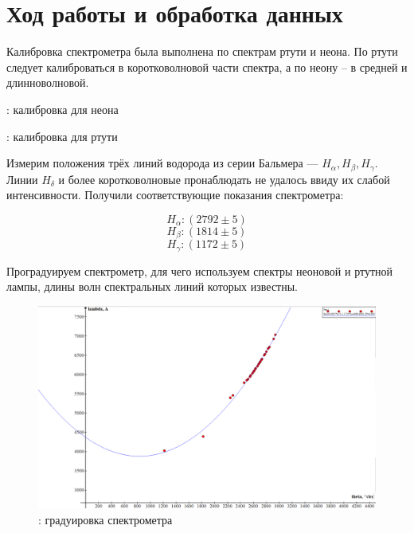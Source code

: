         \newpage

        \section{Ход работы и обработка данных}
        
        Калибровка спектрометра была выполнена по спектрам ртути и неона. По ртути следует калиброваться в коротковолновой части спектра, а по неону -- в средней и длинноволновой.

        \begin{table}[h!]
            \centering
            
            \caption{: калибровка для неона}
        \label{tb1}
        \end{table}
    
        \begin{table}[h!]
            \centering
            
            \caption{: калибровка для ртути}
        \label{tb2}
        \end{table}

        Измерим положения трёх линий водорода из серии Бальмера --- $H_{\alpha}, H_{\beta}, H_{\gamma}$. Линии $H_{\delta}$ и более коротковолновые пронаблюдать не удалось ввиду их слабой интенсивности.	Получили соответствующие показания спектрометра:
		
		\[	H_{\alpha}: (2792\pm 5) \] 
        \[  H_{\beta} : (1814 \pm 5) \]
        \[ H_{\gamma} : (1172 \pm 5) \]

		Проградуируем спектрометр, для чего используем спектры неоновой и ртутной лампы, длины волн спектральных линий которых известны. 
		
        \begin{figure}[h!]
            \centering
            \includegraphics[width=1.0\linewidth]{pics/grad.png}
            \caption{ : градуировка спектрометра}
            \label{al}
        \end{figure}
	
